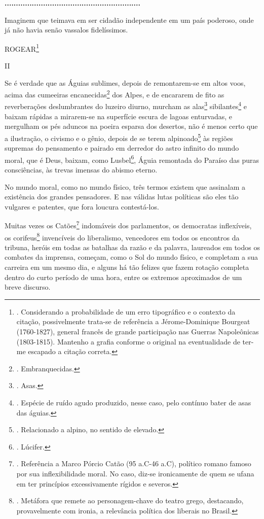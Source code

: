 \textbf{............................................................}

Imaginem que teimava em ser cidadão independente em um país poderoso,
onde já não havia senão vassalos fidelíssimos.

ROGEAR\footnote{. Considerando a probabilidade de um erro tipográfico e
  o contexto da citação, possivelmente trata-se de referência a
  Jérome-Dominique Bourgeat (1760-1827), general francês de grande
  participação nas Guerras Napoleônicas (1803-1815). Mantenho a grafia
  conforme o original na eventualidade de ter-me escapado a citação
  correta.}

II

Se é verdade que as Águias sublimes, depois de remontarem-se em altos
voos, acima das cumeeiras encanecidas\footnote{. Embranquecidas.} dos
Alpes, e de encararem de fito as reverberações deslumbrantes do luzeiro
diurno, murcham as alas\footnote{. Asas.} sibilantes\footnote{. Espécie
  de ruído agudo produzido, nesse caso, pelo contínuo bater de asas das
  águias.} e baixam rápidas a mirarem-se na superfície escura de lagoas
enturvadas, e mergulham os pés aduncos na poeira esparsa dos desertos,
não é menos certo que a ilustração, o civismo e o gênio, depois de se
terem alpinoado\footnote{. Relacionado a alpino, no sentido de elevado.}
às regiões supremas do pensamento e pairado em derredor do astro
infinito do mundo moral, que é Deus, baixam, como Lusbel\footnote{.
  Lúcifer.}, Águia remontada do Paraíso das puras consciências, às
trevas imensas do abismo eterno.

No mundo moral, como no mundo físico, três termos existem que assinalam
a existência dos grandes pensadores. E nas válidas lutas políticas são
eles tão vulgares e patentes, que fora loucura contestá-los.

Muitas vezes os Catões\footnote{. Referência a Marco Pórcio Catão (95
  a.C-46 a.C), político romano famoso por sua inflexibilidade moral. No
  caso, diz-se ironicamente de quem se ufana em ter princípios
  excessivamente rígidos e severos.} indomáveis dos parlamentos, os
democratas inflexíveis, os corifeus\footnote{. Metáfora que remete ao
  personagem-chave do teatro grego, destacando, provavelmente com
  ironia, a relevância política dos liberais no Brasil.} invencíveis do
liberalismo, vencedores em todos os encontros da tribuna, heróis em
todas as batalhas da razão e da palavra, laureados em todos os combates
da imprensa, começam, como o Sol do mundo físico, e completam a sua
carreira em um mesmo dia, e alguns há tão felizes que fazem rotação
completa dentro do curto período de uma hora, entre os extremos
aproximados de um breve discurso.

